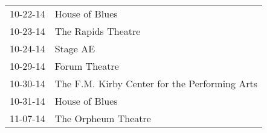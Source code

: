 \begin{supertabular}{p{0.07\textwidth}p{0.23\textwidth}}
 10-22-14 &                                 House of Blues \\
 10-23-14 &                             The Rapids Theatre \\
 10-24-14 &                                       Stage AE \\
 10-29-14 &                                  Forum Theatre \\
 10-30-14 &  The F.M. Kirby Center for the Performing Arts \\
 10-31-14 &                                 House of Blues \\
 11-07-14 &                            The Orpheum Theatre \\
\end{supertabular}
